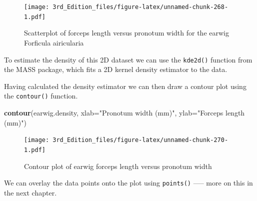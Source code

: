 \documentclass[
]{book}
\newenvironment{Shaded}{\begin{snugshade}}{\end{snugshade}}
\newcommand{\DataTypeTok}[1]{\textcolor[rgb]{0.13,0.29,0.53}{#1}}
\newcommand{\DecValTok}[1]{\textcolor[rgb]{0.00,0.00,0.81}{#1}}
\newcommand{\KeywordTok}[1]{\textcolor[rgb]{0.13,0.29,0.53}{\textbf{#1}}}
\newcommand{\NormalTok}[1]{#1}
\newcommand{\OperatorTok}[1]{\textcolor[rgb]{0.81,0.36,0.00}{\textbf{#1}}}
\newcommand{\StringTok}[1]{\textcolor[rgb]{0.31,0.60,0.02}{#1}}
\begin{document}
\begin{Shaded}
\end{Shaded}

\begin{figure}
\centering
\texttt{[image: 3rd\_Edition\_files/figure-latex/unnamed-chunk-268-1.pdf]}
\caption{\label{fig:unnamed-chunk-268}Scatterplot of forceps length versus pronotum width for the earwig Forficula airicularia}
\end{figure}

To estimate the density of this 2D dataset we can use the \texttt{kde2d()} function from the MASS package, which fits a 2D kernel density estimator to the data.

\begin{Shaded}
\end{Shaded}

Having calculated the density estimator we can then draw a contour plot using the \texttt{contour()} function.

\begin{Shaded}
\begin{Highlighting}[]
\KeywordTok{contour}\NormalTok{(earwig.density, }\DataTypeTok{xlab=}\StringTok{"Pronotum width (mm)"}\NormalTok{, }\DataTypeTok{ylab=}\StringTok{"Forceps length (mm)"}\NormalTok{)}
\end{Highlighting}
\end{Shaded}

\begin{figure}
\centering
\texttt{[image: 3rd\_Edition\_files/figure-latex/unnamed-chunk-270-1.pdf]}
\caption{\label{fig:unnamed-chunk-270}Contour plot of earwig forceps length versus pronotum width}
\end{figure}

We can overlay the data points onto the plot using \texttt{points()} ----- more on this in the next chapter.
\end{document}
